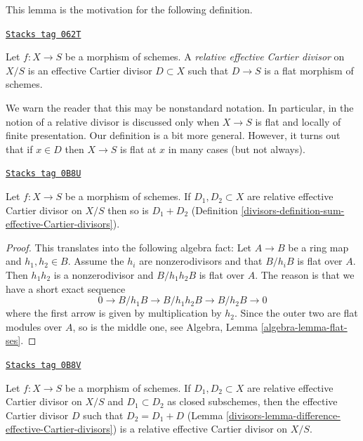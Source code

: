 This lemma is the motivation for the following definition.

\begin{definition}
\label{divisors-definition-relative-effective-Cartier-divisor}
\href{https://stacks.math.columbia.edu/tag/062T}{\texttt{Stacks tag 062T}}

Let $f : X \to S$ be a morphism of schemes.
A {\it relative effective Cartier divisor} on $X/S$ is an
effective Cartier divisor $D \subset X$ such that $D \to S$
is a flat morphism of schemes.
\end{definition}

We warn the reader that this may be nonstandard notation.
In particular, in \cite[IV, Section 21.15]{EGA} the notion of a
relative divisor is discussed only when $X \to S$ is flat and
locally of finite presentation. Our definition is a bit more general.
However, it turns out that if $x \in D$ then $X \to S$ is
flat at $x$ in many cases (but not always).

\begin{lemma}
\label{divisors-lemma-sum-relative-effective-Cartier-divisor}
\href{https://stacks.math.columbia.edu/tag/0B8U}{\texttt{Stacks tag 0B8U}}

Let $f : X \to S$ be a morphism of schemes. If $D_1, D_2 \subset X$
are relative effective Cartier divisor on $X/S$ then so
is $D_1 + D_2$ (Definition \ref{divisors-definition-sum-effective-Cartier-divisors}).
\end{lemma}

\begin{proof}
This translates into the following algebra fact:
Let $A \to B$ be a ring map and $h_1, h_2 \in B$.
Assume the $h_i$ are nonzerodivisors and that $B/h_iB$ is flat over $A$.
Then $h_1h_2$ is a nonzerodivisor and $B/h_1h_2B$ is flat over $A$.
The reason is that we have a short exact sequence
$$
0 \to B/h_1B \to B/h_1h_2B \to B/h_2B \to 0
$$
where the first arrow is given by multiplication by $h_2$. Since
the outer two are flat modules over $A$, so is the middle one, see
Algebra, Lemma \ref{algebra-lemma-flat-ses}.
\end{proof}

\begin{lemma}
\label{divisors-lemma-difference-relative-effective-Cartier-divisor}
\href{https://stacks.math.columbia.edu/tag/0B8V}{\texttt{Stacks tag 0B8V}}

Let $f : X \to S$ be a morphism of schemes. If $D_1, D_2 \subset X$
are relative effective Cartier divisor on $X/S$ and $D_1 \subset D_2$
as closed subschemes, then the effective Cartier divisor $D$
such that $D_2 = D_1 + D$
(Lemma \ref{divisors-lemma-difference-effective-Cartier-divisors}) is
a relative effective Cartier divisor on $X/S$.
\end{lemma}

